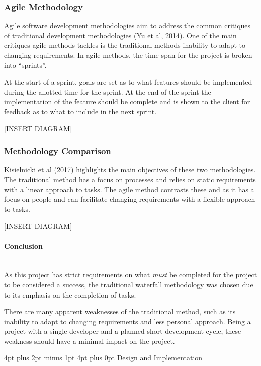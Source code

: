 \documentclass[12pt,a4paper]{article}
\makeatletter
\renewcommand\section{\@startsection {section}{1}{0mm} %
                               {4pt plus 2pt minus 1pt} %
                               {4pt plus 0pt} %
                               {\bfseries}}
\makeatother
\begin{document}
\subsubsection{Agile Methodology}

Agile software development methodologies aim to address the common critiques of traditional development methodologies (Yu et al, 2014). One of the main critiques agile methods tackles is the traditional methods inability to adapt to changing requirements. In agile methods, the time span for the project is broken into ``sprints''.

At the start of a sprint, goals are set as to what features should be implemented during the allotted time for the sprint. At the end of the sprint the implementation of the feature should be complete and is shown to the client for feedback as to what to include in the next sprint.

[INSERT DIAGRAM]

\subsubsection{Methodology Comparison}

Kisielnicki et al (2017) highlights the main objectives of these two methodologies. The traditional method has a focus on processes and relies on static requirements with a linear approach to tasks. The agile method contrasts these and as it has a focus on people and can facilitate changing requirements with a flexible approach to tasks.

[INSERT DIAGRAM]

\paragraph{Conclusion}\mbox{}\\

As this project has strict requirements on what \emph{must} be completed for the project to be considered a success, the traditional waterfall methodology was chosen due to its emphasis on the completion of tasks.

There are many apparent weaknesses of the traditional method, such as its inability to adapt to changing requirements and less personal approach. Being a project with a single developer and a planned short development cycle, these weakness should have a minimal impact on the project.

\newpage
\section{Design and Implementation}
\end{document}
